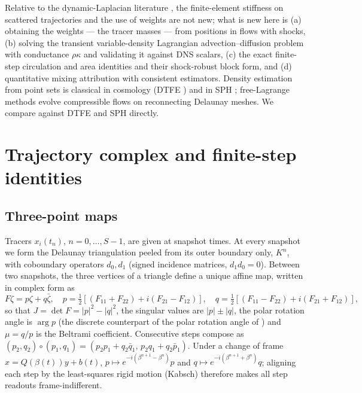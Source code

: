 \documentclass[11pt]{article}
\theoremstyle{definition}\newtheorem{definition}{Definition}\theoremstyle{remark}\newtheorem{remark}{Remark}
\begin{document}
Relative to the dynamic-Laplacian literature \citep{FroylandJunge2018,FroylandKwok2020,KarraschKeller2020}, the finite-element stiffness on scattered trajectories and the use of weights are not new; what is new here is (a) obtaining the weights --- the tracer masses --- from positions in flows with shocks, (b) solving the transient variable-density Lagrangian advection--diffusion problem with conductance $\rho\kappa$ and validating it against DNS scalars, (c) the exact finite-step circulation and area identities and their shock-robust block form, and (d) quantitative mixing attribution with consistent estimators. Density estimation from point sets is classical in cosmology (DTFE \citep{Schaap2000}) and in SPH \citep{Monaghan2005}; free-Lagrange methods \citep{FreeLagrange1985} evolve compressible flows on reconnecting Delaunay meshes. We compare against DTFE and SPH directly.

\section{Trajectory complex and finite-step identities}\label{sec:identities}
\subsection{Three-point maps}
Tracers $x_i(t_n)$, $n=0,\dots,S-1$, are given at snapshot times. At every snapshot we form the Delaunay triangulation peeled from its outer boundary only, $K^n$, with coboundary operators $d_0,d_1$ (signed incidence matrices, $d_1d_0=0$). Between two snapshots, the three vertices of a triangle define a unique affine map, written in complex form as
\begin{equation}
F\zeta=p\zeta+q\bar\zeta,\quad p=\tfrac12[(F_{11}+F_{22})+i(F_{21}-F_{12})],\quad q=\tfrac12[(F_{11}-F_{22})+i(F_{21}+F_{12})],
\end{equation}
so that $J=\det F=|p|^2-|q|^2$, the singular values are $|p|\pm|q|$, the polar rotation angle is $\arg p$ (the discrete counterpart of the polar rotation angle of \citep{FarazmandHaller2016}) and $\mu=q/p$ is the Beltrami coefficient. Consecutive steps compose as $(p_2,q_2)\circ(p_1,q_1)=(p_2p_1+q_2\bar q_1,\,p_2q_1+q_2\bar p_1)$. Under a change of frame $x=Q(\beta(t))y+b(t)$, $p\mapsto e^{-i(\beta^{n+1}-\beta^n)}p$ and $q\mapsto e^{-i(\beta^{n+1}+\beta^n)}q$; aligning each step by the least-squares rigid motion (Kabsch) therefore makes all step readouts frame-indifferent.
\end{document}
